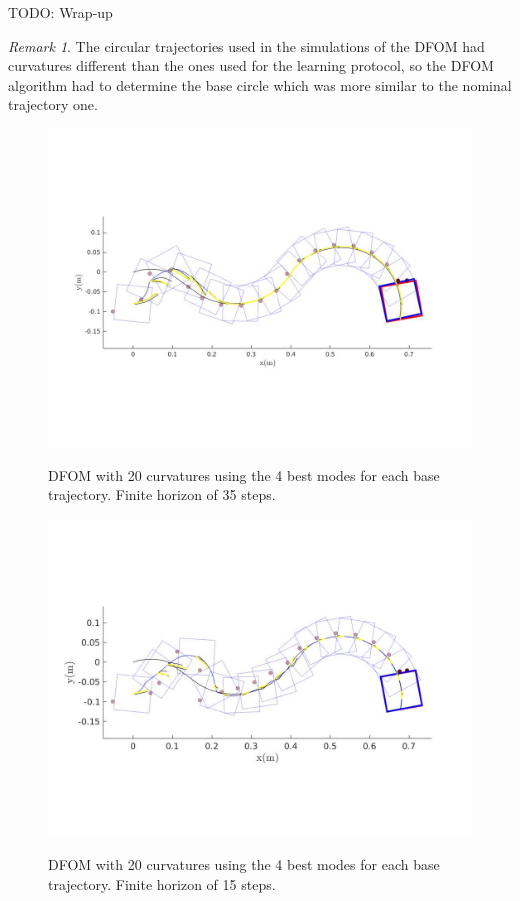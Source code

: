 \documentclass[12,twoside]{TFG-GM}
\theoremstyle{definition}
\theoremstyle{remark}
\newtheorem{remark}[theorem]{Remark}
\begin{document}
TODO: Wrap-up

\begin{remark}
The circular trajectories used in the simulations of the DFOM had curvatures different than the ones used for the learning protocol, so the DFOM algorithm had to determine the base circle which was more similar to the nominal trajectory one.
\end{remark}

\begin{figure}
    \centering
    \begin{minipage}{0.7\textwidth}
        \centering
        \includegraphics[width=1\textwidth] {dfom_trajectory_long_horizon.jpg} \label{fig:dfom_trajectory_long_horizon}%
        \caption{DFOM with 20 curvatures using the 4 best modes for each base trajectory. Finite horizon of 35 steps.}
    \end{minipage}
    \begin{minipage}{0.7\textwidth}
        \centering
        \includegraphics[width=1\textwidth]{dfom_trajectory_short_horizon_15_steps.jpg} %
        \label{fig:dfom_trajectory_short_horizon}
        \caption{DFOM with 20 curvatures using the 4 best modes for each base trajectory. Finite horizon of 15 steps.}
    \end{minipage}
\end{figure}
\end{document}
